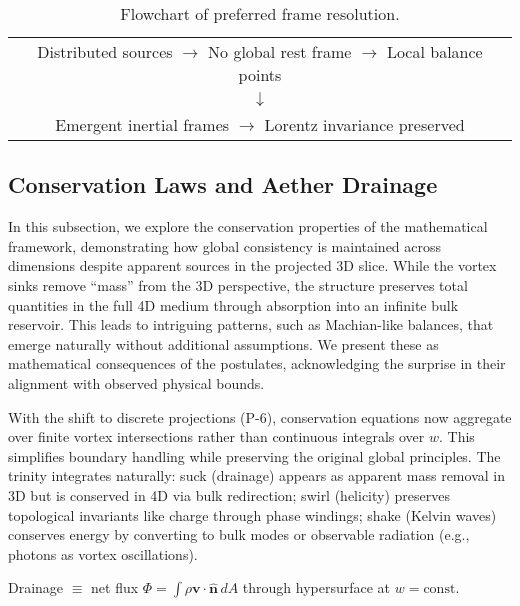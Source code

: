 \begin{table}[h]
\centering
\begin{tabular}{c}
Distributed sources $\to$ No global rest frame $\to$ Local balance points \\
$\downarrow$ \\
Emergent inertial frames $\to$ Lorentz invariance preserved
\end{tabular}
\caption{Flowchart of preferred frame resolution.}
\label{tab:frame-flow}
\end{table}

\medskip
\noindent
{}
\medskip

\subsection{Conservation Laws and Aether Drainage}

In this subsection, we explore the conservation properties of the mathematical framework, demonstrating how global consistency is maintained across dimensions despite apparent sources in the projected 3D slice. While the vortex sinks remove ``mass'' from the 3D perspective, the structure preserves total quantities in the full 4D medium through absorption into an infinite bulk reservoir. This leads to intriguing patterns, such as Machian-like balances, that emerge naturally without additional assumptions. We present these as mathematical consequences of the postulates, acknowledging the surprise in their alignment with observed physical bounds.

With the shift to discrete projections (P-6), conservation equations now aggregate over finite vortex intersections rather than continuous integrals over $w$. This simplifies boundary handling while preserving the original global principles. The trinity integrates naturally: suck (drainage) appears as apparent mass removal in 3D but is conserved in 4D via bulk redirection; swirl (helicity) preserves topological invariants like charge through phase windings; shake (Kelvin waves) conserves energy by converting to bulk modes or observable radiation (e.g., photons as vortex oscillations).

Drainage $\equiv$ net flux $\Phi = \int \rho \mathbf{v} \cdot \hat{\mathbf{n}} \, dA$ through hypersurface at $w = \text{const}$.

